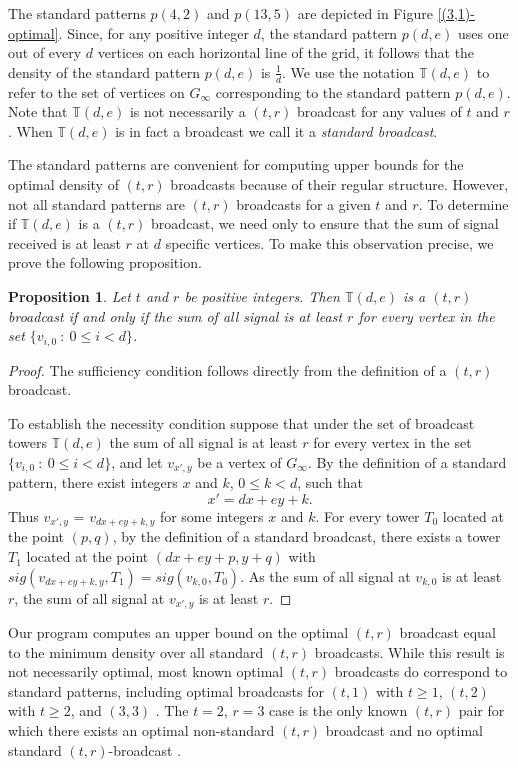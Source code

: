 \documentclass[12pt]{amsart}
\newtheorem{proposition}{Proposition}
\newcounter{x}
\newcounter{y}
\newcounter{x2}
\newcounter{y2}
\newcommand{\T}{
    \mathbb{T}
}
\begin{document}
The standard patterns $p(4,2)$ and $p(13,5)$ are depicted in Figure \ref{(3,1)-optimal}. Since, for any positive integer $d$, the standard pattern $p(d,e)$ uses one out of every $d$ vertices on each horizontal line of the grid, it follows that the density of the standard pattern $p(d,e)$ is  $\frac{1}{d}$. We use the notation $\T(d,e)$ to refer to the set of vertices on $G_\infty$ corresponding to the standard pattern $p(d,e)$. Note that $\T(d,e)$ is not necessarily a $(t,r)$ broadcast for any values of $t$ and $r$. When $\T(d,e)$ is in fact a broadcast we call it a \emph{standard broadcast}.

The standard patterns are convenient for computing upper bounds for the optimal density of $(t,r)$ broadcasts because of their regular structure. However, not all standard patterns are $(t,r)$ broadcasts for a given $t$ and $r$. To determine if $\T(d,e)$ is a $(t,r)$ broadcast, we need only to ensure that the sum of signal received is at least $r$ at $d$ specific vertices.  To make this observation precise, we prove the following proposition.

\begin{proposition} 
Let $t$ and $r$ be positive integers. Then $\T(d,e)$ is a $(t,r)$ broadcast if and only if the sum of all signal is at least $r$ for every vertex in the set $\{v_{i,0} \ : \ 0\leq i<d\}$.
\label{prop_stdbroadcast}
\end{proposition}

\begin{proof}
The sufficiency condition follows directly from the definition of a $(t,r)$ broadcast.

To establish the necessity condition suppose that under the set of broadcast towers $\T(d,e)$ the sum of all signal is at least $r$ for every vertex in the set $\{v_{i,0} \ : \ 0\leq i<d\}$, and let $v_{x',y}$ be a vertex of $G_\infty$. By the definition of a standard pattern, there exist integers $x$ and $k$, $0\leq k<d$, such that \[x'=dx+ey+k.\]
Thus $v_{x',y}$ = $v_{dx+ey+k,y}$ for some integers $x$ and $k$. For every tower $T_0$ located at the point $(p,q)$, by the definition of a standard broadcast, there exists a tower $T_1$ located at the point $(dx+ey+p,y+q)$ with $sig(v_{dx+ey+k,y},T_1)=sig(v_{k,0},T_0)$. As the sum of all signal at $v_{k,0}$ is at least $r$, the sum of all signal at $v_{x',y}$ is at least $r$.
\end{proof}

Our program computes an upper bound on the optimal $(t,r)$ broadcast equal to the minimum density over all standard $(t,r)$ broadcasts. While this result is not necessarily optimal, most known optimal $(t,r)$ broadcasts do correspond to standard patterns, including optimal broadcasts for $(t,1)$ with $t\geq 1$, $(t,2)$ with $t\geq 2$, and $(3,3)$ \cite{blessing2015t,DHR}. The $t=2$, $r=3$ case is the only known $(t,r)$ pair for which there exists an optimal non-standard $(t,r)$ broadcast and no optimal standard $(t,r)$-broadcast \cite{DHR}.
\end{document}
